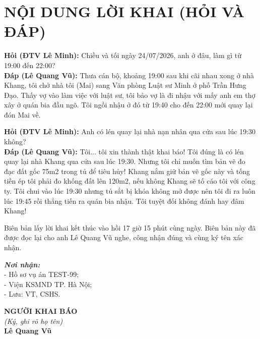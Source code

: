 \documentclass[12pt,a4paper]{article}
\begin{document}
\section*{NỘI DUNG LỜI KHAI (HỎI VÀ ĐÁP)}

\noindent \textbf{Hỏi (ĐTV Lê Minh):} Chiều và tối ngày 24/07/2026, anh ở đâu, làm gì từ 19:00 đến 22:00?\\
\textbf{Đáp (Lê Quang Vũ):} Thưa cán bộ, khoảng 19:00 sau khi cãi nhau xong ở nhà Khang, tôi chở nhà tôi (Mai) sang Văn phòng Luật sư Minh ở phố Trần Hưng Đạo. Thấy vợ vào làm việc với luật sư, tôi bảo vợ là đi nhậu với mấy anh em thợ xây ở quán bia đầu ngõ. Tôi ngồi nhậu ở đó từ 19:40 cho đến 22:00 mới quay lại đón Mai về.

\noindent \textbf{Hỏi (ĐTV Lê Minh):} Anh có lén quay lại nhà nạn nhân qua cửa sau lúc 19:30 không?\\
\textbf{Đáp (Lê Quang Vũ):} Tôi... tôi xin thành thật khai báo! Tôi đúng là có lén quay lại nhà Khang qua cửa sau lúc 19:30. Nhưng tôi chỉ muốn tìm bản vẽ đo đạc đất gốc 75m2 trong tủ để tiêu hủy! Khang nắm giữ bản vẽ gốc này và tống tiền ép tôi phải đo khống đất lên 120m2, nếu không Khang sẽ tố cáo tôi với công ty. Tôi chui vào lúc 19:30 nhưng tủ sắt bị khóa không mở được nên tôi đi ra luôn lúc 19:45 rồi thẳng tiến ra quán bia nhậu. Tôi tuyệt đối không đánh hay đâm Khang!

\noindent Biên bản lấy lời khai kết thúc vào hồi 17 giờ 15 phút cùng ngày. Biên bản này đã được đọc lại cho anh Lê Quang Vũ nghe, công nhận đúng và cùng ký tên xác nhận.

\vspace{0.8cm}

\noindent
\begin{minipage}[t]{0.45\textwidth}
    \small
    \textbf{\textit{Nơi nhận:}}\\
    - Hồ sơ vụ án TEST-99;\\
    - Viện KSMND TP. Hà Nội;\\
    - Lưu: VT, CSHS.
\end{minipage}
\hfill
\begin{minipage}[t]{0.5\textwidth}
    \begin{center}
        \small
        \textbf{NGƯỜI KHAI BÁO}\\
        \textit{(Ký, ghi rõ họ tên)}\\[1.5cm]
        \textbf{Lê Quang Vũ}
    \end{center}
\end{minipage}
\end{document}
